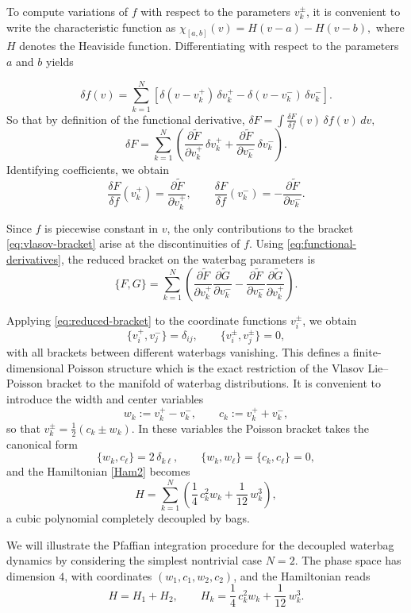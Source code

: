 \documentclass{article}
\theoremstyle{remark}
\theoremstyle{definition}
\begin{document}
To compute variations of $f$ with respect to the parameters $v_k^\pm$, it is
convenient to write the characteristic function as $\chi_{[a,b]}(v)=H(v-a)-H(v-b),$
where $H$ denotes the Heaviside function. Differentiating with respect to the
parameters $a$ and $b$ yields


\[
\delta f(v)
=
\sum_{k=1}^N
\left[
\delta(v-v_k^+)\,\delta v_k^+
-
\delta(v-v_k^-)\,\delta v_k^-
\right].
\]
So that by definition of the functional derivative, $\delta F
=
\int \frac{\delta F}{\delta f}(v)\,\delta f(v)\,dv,$
\[
\delta F
=
\sum_{k=1}^N
\left(
\frac{\partial \tilde F}{\partial v_k^+}\,\delta v_k^+
+
\frac{\partial \tilde F}{\partial v_k^-}\,\delta v_k^-
\right).
\]
Identifying coefficients, we obtain
\begin{equation}\label{eq:functional-derivatives}
\frac{\delta F}{\delta f}(v_k^+)
=
\frac{\partial \tilde F}{\partial v_k^+},
\qquad
\frac{\delta F}{\delta f}(v_k^-)
=
-\frac{\partial \tilde F}{\partial v_k^-}.
\end{equation}

Since $f$ is piecewise constant in $v$, the only contributions to the bracket
\eqref{eq:vlasov-bracket} arise at the discontinuities of $f$. Using
\eqref{eq:functional-derivatives}, the reduced bracket on the waterbag
parameters is
\begin{equation}\label{eq:reduced-bracket}
\{F,G\}
=
\sum_{k=1}^N
\left(
\frac{\partial \tilde F}{\partial v_k^+}
\frac{\partial \tilde G}{\partial v_k^-}
-
\frac{\partial \tilde F}{\partial v_k^-}
\frac{\partial \tilde G}{\partial v_k^+}
\right).
\end{equation}

Applying \eqref{eq:reduced-bracket} to the coordinate functions
$v_i^\pm$, we obtain
\[
\{v_i^+,v_j^-\}=\delta_{ij},
\qquad
\{v_i^\pm,v_j^\pm\}=0,
\]
with all brackets between different waterbags vanishing. This defines a
finite-dimensional Poisson structure which is the exact restriction of the
Vlasov Lie--Poisson bracket to the manifold of waterbag distributions.
It is convenient to introduce the width and center variables
\[
w_k := v_k^+ - v_k^-,
\qquad
c_k := v_k^+ + v_k^-,
\]
so that $v_k^\pm=\tfrac12(c_k\pm w_k)$. In these variables the Poisson bracket
takes the canonical form
\[
\{w_k,c_\ell\}=2\,\delta_{k\ell},
\qquad
\{w_k,w_\ell\}=\{c_k,c_\ell\}=0,
\]
and the Hamiltonian \eqref{Ham2} becomes
\[
H
=
\sum_{k=1}^N
\left(
\frac14\,c_k^2 w_k
+
\frac{1}{12}\,w_k^3
\right),
\]
a cubic polynomial completely decoupled by bags. 

We will illustrate the Pfaffian integration procedure for the decoupled
waterbag dynamics by considering the simplest nontrivial case
$N=2$. The phase space has dimension $4$, with coordinates
$(w_1,c_1,w_2,c_2)$, and the Hamiltonian reads
\[
H = H_1 + H_2,
\qquad
H_k=\frac14\,c_k^2 w_k+\frac{1}{12}\,w_k^3.
\]
\end{document}
